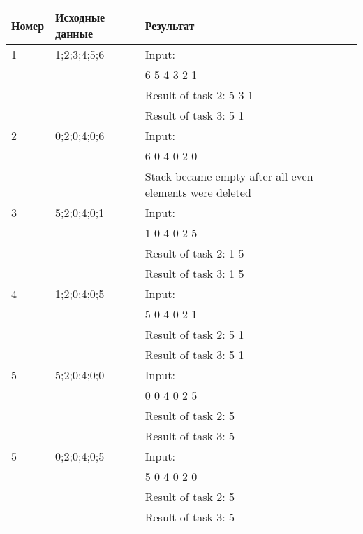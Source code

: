\begin{table}[H]
    \centering
    \begin{tabular}{|l|l|l|}
        \hline
        Номер & Исходные данные & Результат\\[2ex] \hline
        1     & 1;2;3;4;5;6     & Input:\\
              &                 & 6 5 4 3 2 1\\ 
              &                 & Result of task 2: 5 3 1\\ 
              &                 & Result of task 3: 5 1\\[2ex] \hline
        2     & 0;2;0;4;0;6     & Input:\\
              &                 & 6 0 4 0 2 0\\
              &                 & Stack became empty after all even elements were deleted\\[2ex] \hline
        3     & 5;2;0;4;0;1     & Input:\\
              &                 & 1 0 4 0 2 5\\ 
              &                 & Result of task 2: 1 5\\  
              &                 & Result of task 3: 1 5\\[2ex] \hline
        4     & 1;2;0;4;0;5     & Input:\\
              &                 & 5 0 4 0 2 1\\ 
              &                 & Result of task 2: 5 1\\  
              &                 & Result of task 3: 5 1\\[2ex] \hline
        5     & 5;2;0;4;0;0     & Input:\\
              &                 & 0 0 4 0 2 5\\ 
              &                 & Result of task 2: 5\\  
              &                 & Result of task 3: 5\\[2ex] \hline
        5     & 0;2;0;4;0;5     & Input:\\
              &                 & 5 0 4 0 2 0\\ 
              &                 & Result of task 2: 5\\  
              &                 & Result of task 3: 5\\[2ex] \hline
    \end{tabular}
\end{table}
